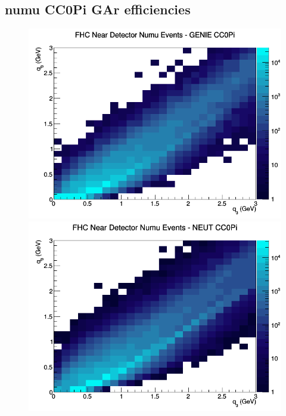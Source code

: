 \subsection{numu CC0Pi GAr efficiencies}
\begin{figure}[h]
\includegraphics[width=\linewidth]{eff_q0_q3/GAr/CC0Pi_FHC_ND_numu_q3_q0_GENIE.png}
\endminipage
{}
\includegraphics[width=\linewidth]{eff_q0_q3/GAr/CC0Pi_FHC_ND_numu_q3_q0_NEUT.png}
\endminipage
{}

\end{figure}
